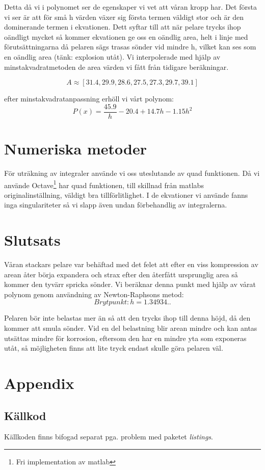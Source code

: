 \documentclass[a4paper,10pt]{article}
\begin{document}
Detta då vi i polynomet ser de egenskaper vi vet att våran kropp har. Det första vi ser är att för små h värden växer sig första termen väldigt stor och är den dominerande termen i ekvationen. Dett syftar till att när pelare trycks ihop oändligt mycket så kommer ekvationen ge oss en oändlig area, helt i linje med förutsättningarna då pelaren sägs trasas sönder vid mindre h, vilket kan ses som en oändlig area (tänk: explosion utåt). Vi interpolerade med hjälp av minstakvadratmetoden de area värden vi fått från tidigare beräkningar.

$$ A\approx[31.4 , 29.9 , 28.6 , 27.5 , 27.3 , 29.7 , 39.1]$$

efter minstakvadratanpassning erhöll vi vårt polynom:
$$ P(x)= \frac{45.9}{h} - 20.4 + 14.7 h - 1.15 h^2 $$

\section{Numeriska metoder}
För uträkning av integraler använde vi oss uteslutande av quad funktionen. Då vi använde Octave\footnote{Fri implementation av matlab} har quad funktionen, till skillnad från matlabs originalinställning, väldigt bra tillförlitlighet. I de ekvationer vi använde fanns inga singulariteter så vi slapp även undan förbehandlig av integralerna.

\section{Slutsats}
Våran stackars pelare var behäftad med det felet att efter en viss kompression av arean åter börja expandera och strax efter den återfått ursprunglig area så kommer den tyvärr spricka sönder. Vi beräknar denna punkt med hjälp av vårat polynom genom användning av Newton-Raphsons metod:
$$ Brytpunkt:  h = 1.34934.. $$

Pelaren bör inte belastas mer än så att den trycks ihop till denna höjd, då den kommer att smula sönder. Vid en del belastning blir arean mindre och kan antas utsättas mindre för korrosion, eftersom den har en mindre yta som exponeras utåt, så möjligheten finns att lite tryck endast skulle göra pelaren väl.


\newpage
\section {Appendix}
	\subsection{Källkod}
	Källkoden finns bifogad separat pga. problem med paketet \emph{listings}.
\end{document}
